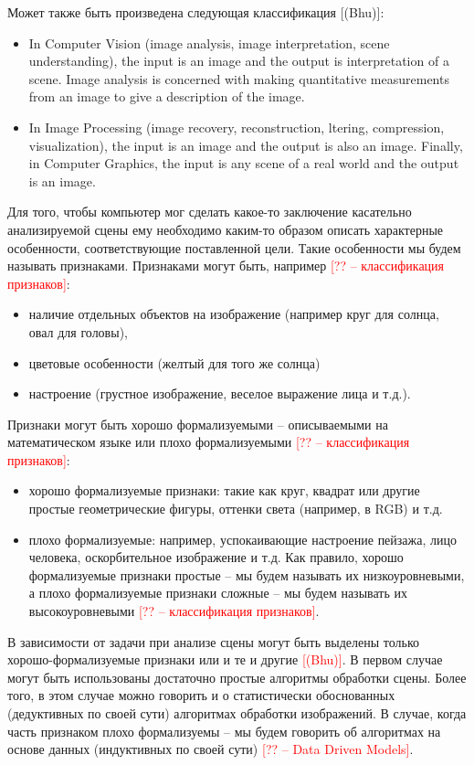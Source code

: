 \documentclass[12pt]{article}
\begin{document}
\begin{sloppypar}
Может также быть произведена следующая классификация [(Bhu)]:
\begin{itemize}
	\color{red}
	\item In Computer Vision (image analysis, image interpretation, scene understanding),
the input is an image and the output is interpretation of a
scene. Image analysis is concerned with making quantitative measurements
from an image to give a description of the image.
	\item In Image Processing (image recovery, reconstruction, ltering, compression,
visualization), the input is an image and the output is also an image.
Finally, in Computer Graphics, the input is any scene of a real world and the output is an image.
 \end{itemize}

Для того, чтобы компьютер мог сделать какое-то заключение касательно анализируемой сцены ему необходимо каким-то образом описать характерные особенности, соответствующие поставленной цели. Такие особенности мы будем называть признаками. Признаками могут быть, например \textcolor{red}{[?? – классификация признаков]}:
\begin{itemize}
\item	наличие отдельных объектов на изображение (например круг для солнца, овал для головы), 
\item	цветовые особенности (желтый для того же солнца) 
\item	настроение (грустное изображение, веселое выражение лица и т.д.).
 \end{itemize}
Признаки могут быть хорошо формализуемыми – описываемыми на математическом языке или плохо формализуемыми \textcolor{red}{[?? – классификация признаков]}:
\begin{itemize}
\item	хорошо формализуемые признаки: такие как круг, квадрат или другие простые геометрические фигуры, оттенки света (например, в RGB) и т.д. 
\item	плохо формализуемые: например, успокаивающие настроение пейзажа, лицо человека, оскорбительное изображение и т.д.
Как правило, хорошо формализуемые признаки простые – мы будем называть их низкоуровневыми, а плохо формализуемые признаки сложные – мы будем называть их высокоуровневыми \textcolor{red}{[?? – классификация признаков]}. 
\end{itemize}
В зависимости от задачи при анализе сцены могут быть выделены только хорошо-формализуемые признаки или и те и другие \textcolor{red}{[(Bhu)]}. В первом случае могут быть использованы достаточно простые алгоритмы обработки сцены. Более того, в этом случае можно говорить и о статистически обоснованных (дедуктивных по своей сути) алгоритмах обработки изображений. В случае, когда часть признаком плохо формализуемы – мы будем говорить об алгоритмах на основе данных (индуктивных по своей сути) \textcolor{red}{[?? – Data Driven Models]}. 


\end{sloppypar}
\end{document}
